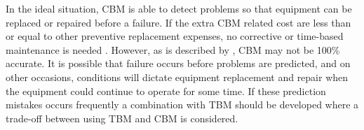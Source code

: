 In the ideal situation, CBM is able to detect problems so that equipment can be replaced or repaired before a failure. If the extra CBM related cost are less than or equal to other preventive replacement expenses, no corrective or time-based maintenance is needed \parencite{mckone2002}. However, as is described by \citet{ALNAJJAR20003}, CBM may not be 100\% accurate. It is possible that failure occurs before problems are predicted, and on other occasions, conditions will dictate equipment replacement and repair when the equipment could continue to operate for some time. If these prediction mistakes occurs frequently a combination with TBM should be developed where a trade-off between using TBM and CBM is considered.

